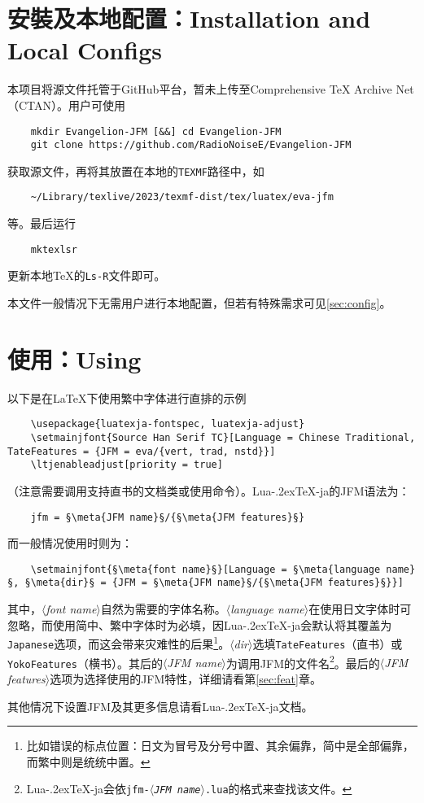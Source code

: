 \documentclass{ltjsarticle}
\def\meta#1{{\normalfont\rmfamily\itshape$\langle$#1\/$\rangle$}}
\def\段{\par}
\def\LuaTeX{Lua\kern-.2ex\TeX}
\begin{document}
\section{安裝及本地配置：Installation and Local Configs}
本项目将源文件托管于GitHub平台，暂未上传至Comprehensive \TeX{} Archive Net（CTAN）。用户可使用
\begin{lstlisting}
    mkdir Evangelion-JFM [&&] cd Evangelion-JFM
    git clone https://github.com/RadioNoiseE/Evangelion-JFM
\end{lstlisting}
获取源文件，再将其放置在本地的\texttt{TEXMF}路径中，如
\begin{lstlisting}
    ~/Library/texlive/2023/texmf-dist/tex/luatex/eva-jfm
\end{lstlisting}
等。最后运行
\begin{lstlisting}
    mktexlsr
\end{lstlisting}
更新本地\TeX{}的\texttt{Ls-R}文件即可。\段
本文件一般情况下无需用户进行本地配置，但若有特殊需求可见\ref{sec:config}。

\section{使用：Using}
以下是在\LaTeX{}下使用繁中字体进行直排的示例
\begin{lstlisting}
    \usepackage{luatexja-fontspec, luatexja-adjust}
    \setmainjfont{Source Han Serif TC}[Language = Chinese Traditional, TateFeatures = {JFM = eva/{vert, trad, nstd}}]
    \ltjenableadjust[priority = true]
\end{lstlisting}
（注意需要调用支持直书的文档类或使用\texttt{\string\tate}命令）。\LuaTeX-ja的JFM语法为：
\begin{lstlisting}
    jfm = §\meta{JFM name}§/{§\meta{JFM features}§}
\end{lstlisting}
而一般情况使用\texttt{\string\setmainjfont}时则为：
\begin{lstlisting}
    \setmainjfont{§\meta{font name}§}[Language = §\meta{language name}§, §\meta{dir}§ = {JFM = §\meta{JFM name}§/{§\meta{JFM features}§}}]
\end{lstlisting}
其中，\meta{font name}自然为需要的字体名称。\meta{language name}在使用日文字体时可忽略，而使用简中、繁中字体时为必填，因\LuaTeX-ja会默认将其覆盖为\texttt{Japanese}选项，而这会带来灾难性的后果\footnote{比如错误的标点位置：日文为冒号及分号中置、其余偏靠，简中是全部偏靠，而繁中则是统统中置。}。\meta{dir}选填\texttt{TateFeatures}（直书）或\texttt{YokoFeatures}（横书）。其后的\meta{JFM name}为调用JFM的文件名\footnote{\LuaTeX-ja会依\texttt{jfm-\meta{JFM name}.lua}的格式来查找该文件。}。最后的\meta{JFM features}选项为选择使用的JFM特性，详细请看第\ref{sec:feat}章。\段
其他情况下设置JFM及其更多信息请看\LuaTeX-ja文档\cite{luatexja-doc}。
\end{document}

